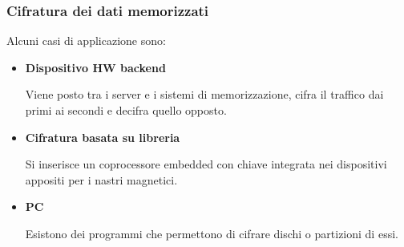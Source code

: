 \documentclass{article}
\begin{document}
\subsubsection{Cifratura dei dati memorizzati}

Alcuni casi di applicazione sono:
\begin{itemize}
    \item \textbf{Dispositivo HW backend}

        Viene posto tra i server e i sistemi di memorizzazione, cifra il traffico dai primi ai secondi e decifra quello opposto.
    
    \item \textbf{Cifratura basata su libreria}

        Si inserisce un coprocessore embedded con chiave integrata nei dispositivi appositi per i nastri magnetici.
    
    \item \textbf{PC}

        Esistono dei programmi che permettono di cifrare dischi o partizioni di essi.
    
\end{itemize}
\end{document}
